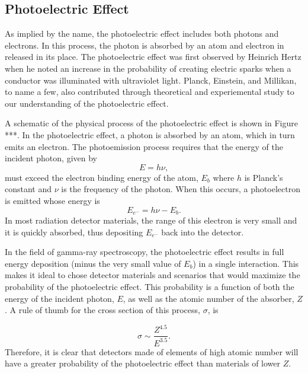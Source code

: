 \subsection{Photoelectric Effect}
As implied by the name, the photoelectric effect includes both photons and electrons.  In this process, the photon is absorbed by an atom and electron in released in its place.  The photoelectric effect was first observed by Heinrich Hertz when he noted an increase in the probability of creating electric sparks when a conductor was illuminated with ultraviolet light. \cite{hertz1887} Planck, Einstein, and Millikan, to name a few, also contributed through theoretical and experiemental study to our understanding of the photoelectric effect. \cite{einstein1905,millikan1914,millikan1916}

A schematic of the physical process of the photoelectric effect is shown in Figure ***.  In the photoelectric effect, a photon is absorbed by an atom, which in turn emits an electron.  The photoemission process requires that the energy of the incident photon, given by
\begin{equation}
E = h\nu,
\label{ch1:photonEnergy}
\end{equation}
must exceed the electron binding energy of the atom, $E_{b}$ where $h$ is Planck's constant and $\nu$ is the frequency of the photon.  When this occurs, a photoelectron is emitted whose energy is
\begin{equation}
E_{e^{-}} = h\nu - E_{b}.
\label{ch1:E_e}
\end{equation}
In most radiation detector materials, the range of this electron is very small and it is quickly absorbed, thus depositing $E_{e^{-}}$ back into the detector.


In the field of gamma-ray spectroscopy, the photoelectric effect results in full energy deposition (minus the very small value of $E_{b}$) in a single interaction.  This makes it ideal to chose detector materials and scenarios that would maximize the probability of the photoelectric effect.  This probability is a function of both the energy of the incident photon, $E$, as well as the atomic number of the absorber, $Z$.  A rule of thumb for the cross section of this process, $\sigma$, is

\begin{equation}
\sigma \sim \frac{Z^{4.5}}{E^{3.5}}.
\label{ch1:photoEcrossSection}
\end{equation}
Therefore, it is clear that detectors made of elements of high atomic number will have a greater probability of the photoelectric effect than materials of lower $Z$.

